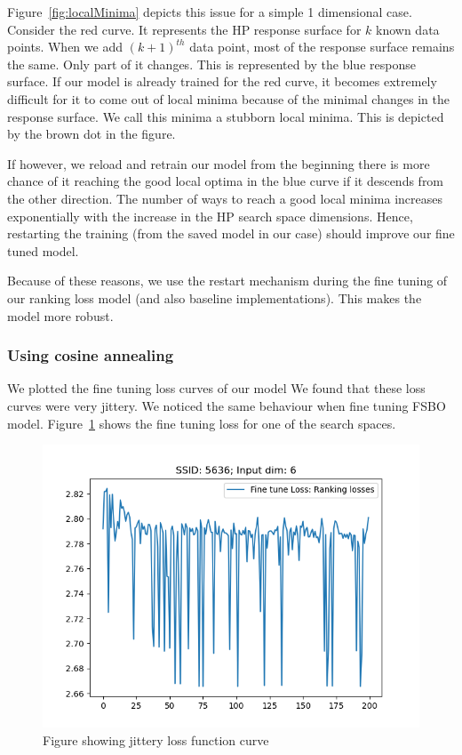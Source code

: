\documentclass[12pt, twoside, ngerman]{report}
\begin{document}
Figure~\ref{fig:localMinima} depicts this issue for a simple 1 dimensional case.
Consider the red curve.
It represents the HP response surface for $k$ known data points.
When we add $(k+1)^{th}$ data point,  most of the response surface remains the same.
Only part of it changes.
This is represented by the blue response surface.
If our model is already trained for the red curve,  it becomes extremely difficult for it to come out of local minima because of the minimal changes in the response surface.
We call this minima a stubborn local minima.
This is depicted by the brown dot in the figure.

If however,  we reload and retrain our model from the beginning there is more chance of it reaching the good local optima in the blue curve if it descends from the other direction.
The number of ways to reach a good local minima increases exponentially with the increase in the HP search space dimensions.
Hence, restarting the training (from the saved model in our case) should improve our fine tuned model.

Because of these reasons,  we use the restart mechanism during the fine tuning of our ranking loss model (and also baseline implementations).
This makes the model more robust.

\subsubsection{Using cosine annealing}

We plotted the fine tuning loss curves of our model
We found that these loss curves were very jittery.
We noticed the same behaviour when fine tuning FSBO model.
Figure~\ref{fig:jitteryFTLoss} shows the fine tuning loss for one of the search spaces.

\begin{figure}[htb]
  \centering
    \includegraphics[scale=0.45]{images/jitteryFTLoss}
    \caption{Figure showing jittery loss function curve}
    \label{fig:jitteryFTLoss}
\end{figure}
\end{document}
